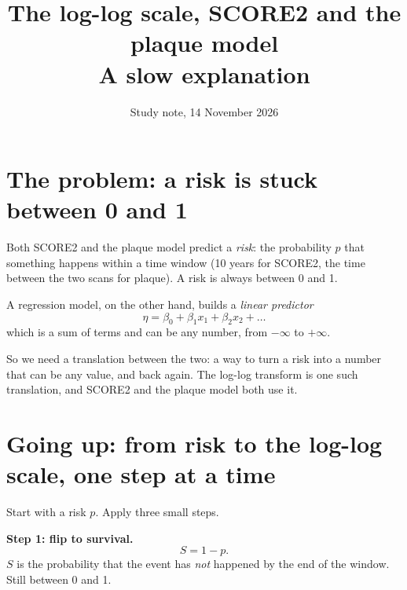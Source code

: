 \documentclass[11pt]{article}
\title{The log-log scale, SCORE2 and the plaque model\\[2pt]\large A slow explanation}
\author{Study note, 14 November 2026}
\date{}
\begin{document}
\maketitle

\section{The problem: a risk is stuck between 0 and 1}

Both SCORE2 and the plaque model predict a \emph{risk}: the probability $p$ that something happens
within a time window (10 years for SCORE2, the time between the two scans for plaque).
A risk is always between 0 and 1.

A regression model, on the other hand, builds a \emph{linear predictor}
\[
  \eta = \beta_0 + \beta_1 x_1 + \beta_2 x_2 + \dots
\]
which is a sum of terms and can be any number, from $-\infty$ to $+\infty$.

So we need a translation between the two: a way to turn a risk into a number that can be any
value, and back again. The log-log transform is one such translation, and SCORE2 and the plaque
model both use it.

\section{Going up: from risk to the log-log scale, one step at a time}

Start with a risk $p$. Apply three small steps.

\textbf{Step 1: flip to survival.}
\[
  S = 1 - p .
\]
$S$ is the probability that the event has \emph{not} happened by the end of the window.
Still between 0 and 1.
\end{document}
